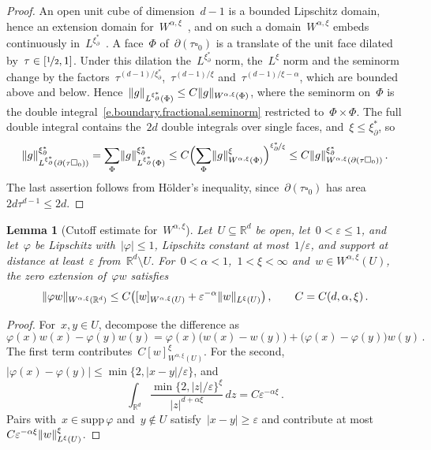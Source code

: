 \documentclass[11pt,letterpaper]{article}
\numberwithin{equation}{section}
\newtheorem{lemma}[theorem]{Lemma}
\theoremstyle{definition}
\newcommand{\Rd}{\mathbb{R}^d}
\newcommand{\nf}{\nicefrac}
\newcommand{\cu}{\square}
\newcommand*{\supp}{\mathrm{supp\,}}
\DeclarePairedDelimiter{\norm}{\lVert}{\rVert}
\renewcommand{\subset}{\subseteq}
\begin{document}
\begin{proof}
An open unit cube of dimension~$d-1$ is a bounded Lipschitz domain, hence an extension domain for~$W^{\alpha,\xi}$~\cite[Theorem~5.4]{DNPV.fractional}, and on such a domain~$W^{\alpha,\xi}$ embeds continuously in~$L^{\xi_\partial^*}$~\cite[Theorem~6.7]{DNPV.fractional}. A face~$\Phi$ of~$\partial(\tau\cu_0)$ is a translate of the unit face dilated by~$\tau\in[\nf12,1]$. Under this dilation the~$L^{\xi_\partial^*}$ norm, the~$L^\xi$ norm and the seminorm change by the factors~$\tau^{(d-1)/\xi_\partial^*}$,~$\tau^{(d-1)/\xi}$ and~$\tau^{(d-1)/\xi-\alpha}$, which are bounded above and below. Hence~$\norm{g}_{L^{\xi_\partial^*}(\Phi)}\leq C\norm{g}_{W^{\alpha,\xi}(\Phi)}$, where the seminorm on~$\Phi$ is the double integral~\eqref{e.boundary.fractional.seminorm} restricted to~$\Phi\times\Phi$. The full double integral contains the~$2d$ double integrals over single faces, and~$\xi\leq\xi_\partial^*$, so
\begin{equation*}
	\norm{g}_{L^{\xi_\partial^*}(\partial(\tau\cu_0))}^{\xi_\partial^*}=\sum_\Phi\norm{g}_{L^{\xi_\partial^*}(\Phi)}^{\xi_\partial^*}\leq C\Bigl(\sum_\Phi\norm{g}_{W^{\alpha,\xi}(\Phi)}^\xi\Bigr)^{\nf{\xi_\partial^*}\xi}\leq C\norm{g}_{W^{\alpha,\xi}(\partial(\tau\cu_0))}^{\xi_\partial^*}\,.
\end{equation*}
The last assertion follows from H\"older's inequality, since~$\partial(\tau\cu_0)$ has area~$2d\tau^{d-1}\leq2d$.
\end{proof}

\begin{lemma}[Cutoff estimate for~$W^{\alpha,\xi}$]
\label{l.fractional.cutoff}
Let~$U\subset\Rd$ be open, let~$0<\varepsilon\leq1$, and let~$\varphi$ be Lipschitz with~$|\varphi|\leq1$, Lipschitz constant at most~$1/\varepsilon$, and support at distance at least~$\varepsilon$ from~$\Rd\setminus U$. For~$0<\alpha<1$,~$1<\xi<\infty$ and~$w\in W^{\alpha,\xi}(U)$, the zero extension of~$\varphi w$ satisfies
\begin{equation}
	\norm{\varphi w}_{W^{\alpha,\xi}(\Rd)}\leq C\bigl([w]_{W^{\alpha,\xi}(U)}+\varepsilon^{-\alpha}\norm{w}_{L^\xi(U)}\bigr)\,,\qquad C=C(d,\alpha,\xi)\,.
	\label{e.fractional.cutoff}
\end{equation}
\end{lemma}

\begin{proof}
For~$x,y\in U$, decompose the difference as
\begin{equation*}
	\varphi(x)w(x)-\varphi(y)w(y)=\varphi(x)\bigl(w(x)-w(y)\bigr)+\bigl(\varphi(x)-\varphi(y)\bigr)w(y)\,.
\end{equation*}
The first term contributes~$C[w]^\xi_{W^{\alpha,\xi}(U)}$. For the second,~$|\varphi(x)-\varphi(y)|\leq\min\{2,|x-y|/\varepsilon\}$, and
\begin{equation*}
	\int_{\Rd}\frac{\min\{2,|z|/\varepsilon\}^\xi}{|z|^{d+\alpha\xi}}\,dz=C\varepsilon^{-\alpha\xi}\,.
\end{equation*}
Pairs with~$x\in\supp\varphi$ and~$y\notin U$ satisfy~$|x-y|\geq\varepsilon$ and contribute at most~$C\varepsilon^{-\alpha\xi}\norm{w}_{L^\xi(U)}^\xi$.
\end{proof}
\end{document}
